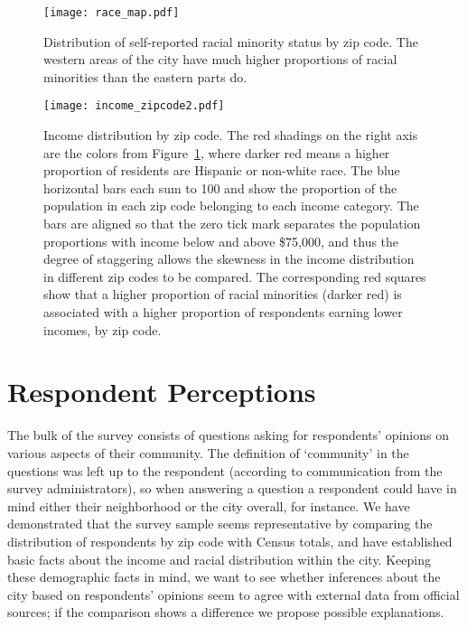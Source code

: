 \begin{figure}
  \centering
  \texttt{[image: race\_map.pdf]}
\caption{Distribution of self-reported racial minority status by zip code.  The western areas of the city have much higher proportions of racial minorities than the eastern parts do.}
\label{fig:nonwhite}       
\end{figure}
\vspace{10mm}
\begin{figure}
  \centering
  \texttt{[image: income\_zipcode2.pdf]}
\caption{Income distribution by zip code. The red shadings on the right axis are the colors from Figure~\ref{fig:nonwhite}, where darker red means a higher proportion of residents are Hispanic or non-white race.  The blue horizontal bars each sum to 100 and show the proportion of the population in each zip code belonging to each income category.  The bars are aligned so that the zero tick mark separates the population proportions with income below and above \$75,000, and thus the degree of staggering allows the skewness in the income distribution in different zip codes to be compared.  The corresponding red squares show that a higher proportion of racial minorities (darker red) is associated with a higher proportion of respondents earning lower incomes, by zip code.}  
\label{fig:LBincome}       
\end{figure}



\section{Respondent Perceptions}

The bulk of the survey consists of questions asking for respondents' opinions on various aspects of their community.  The definition of `community' in the questions was left up to the respondent (according to communication from the survey administrators), so when answering a question a respondent could have in mind either their neighborhood or the city overall, for instance. We have demonstrated that the survey sample seems representative by comparing the distribution of respondents by zip code with Census totals, and have established basic facts about the income and racial distribution within the city.  Keeping these demographic facts in mind, we want to see whether inferences about the city based on respondents' opinions seem to agree with external data from official sources; if the comparison shows a difference we propose possible explanations.


